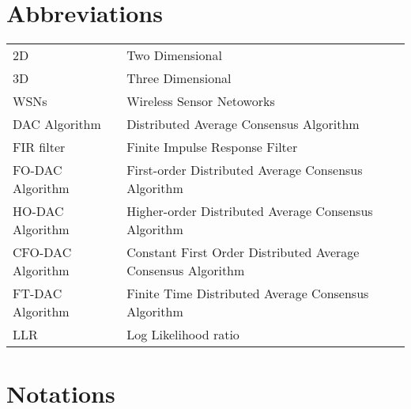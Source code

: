 
\chapter*{Abbreviations}

\begin{tabular}{p{4.0cm} p{11cm}}2D &  Two Dimensional \\
3D &  Three Dimensional\\
WSNs &  Wireless Sensor Netoworks\\
DAC Algorithm &  Distributed Average Consensus Algorithm\\
FIR filter &  Finite Impulse Response Filter\\
FO-DAC Algorithm &  First-order Distributed Average Consensus Algorithm\\
HO-DAC Algorithm &  Higher-order Distributed Average Consensus Algorithm\\
CFO-DAC Algorithm &  Constant First Order Distributed Average Consensus
Algorithm\\
FT-DAC Algorithm &  Finite Time Distributed Average Consensus Algorithm\\
LLR  &  Log Likelihood ratio\\


\end{tabular}


\chapter*{Notations}

